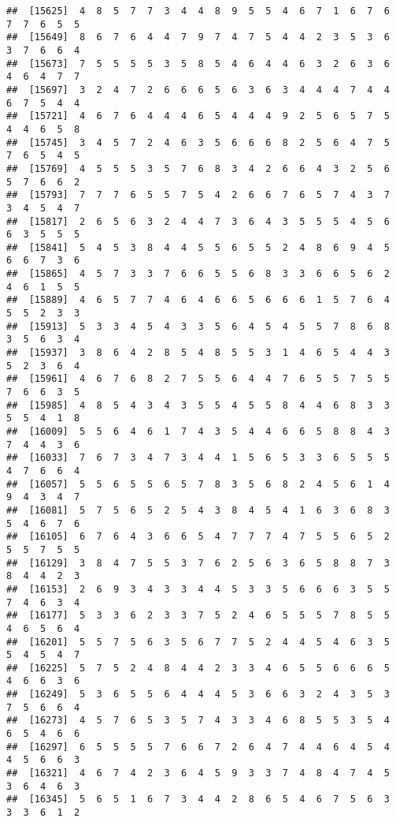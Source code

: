 \documentclass[
]{book}
\begin{document}
\begin{verbatim}
##  [15625]  4  8  5  7  7  3  4  4  8  9  5  5  4  6  7  1  6  7  6  7  7  6  5  5
##  [15649]  8  6  7  6  4  4  7  9  7  4  7  5  4  4  2  3  5  3  6  3  7  6  6  4
##  [15673]  7  5  5  5  5  3  5  8  5  4  6  4  4  6  3  2  6  3  6  4  6  4  7  7
##  [15697]  3  2  4  7  2  6  6  6  5  6  3  6  3  4  4  4  7  4  4  6  7  5  4  4
##  [15721]  4  6  7  6  4  4  4  6  5  4  4  4  9  2  5  6  5  7  5  4  4  6  5  8
##  [15745]  3  4  5  7  2  4  6  3  5  6  6  6  8  2  5  6  4  7  5  7  6  5  4  5
##  [15769]  4  5  5  5  3  5  7  6  8  3  4  2  6  6  4  3  2  5  6  5  7  6  6  2
##  [15793]  7  7  7  6  5  5  7  5  4  2  6  6  7  6  5  7  4  3  7  3  4  5  4  7
##  [15817]  2  6  5  6  3  2  4  4  7  3  6  4  3  5  5  5  4  5  6  6  3  5  5  5
##  [15841]  5  4  5  3  8  4  4  5  5  6  5  5  2  4  8  6  9  4  5  6  6  7  3  6
##  [15865]  4  5  7  3  3  7  6  6  5  5  6  8  3  3  6  6  5  6  2  4  6  1  5  5
##  [15889]  4  6  5  7  7  4  6  4  6  6  5  6  6  6  1  5  7  6  4  5  5  2  3  3
##  [15913]  5  3  3  4  5  4  3  3  5  6  4  5  4  5  5  7  8  6  8  3  5  6  3  4
##  [15937]  3  8  6  4  2  8  5  4  8  5  5  3  1  4  6  5  4  4  3  5  2  3  6  4
##  [15961]  4  6  7  6  8  2  7  5  5  6  4  4  7  6  5  5  7  5  5  7  6  6  3  5
##  [15985]  4  8  5  4  3  4  3  5  5  4  5  5  8  4  4  6  8  3  3  5  5  4  1  8
##  [16009]  5  5  6  4  6  1  7  4  3  5  4  4  6  6  5  8  8  4  3  7  4  4  3  6
##  [16033]  7  6  7  3  4  7  3  4  4  1  5  6  5  3  3  6  5  5  5  4  7  6  6  4
##  [16057]  5  5  6  5  5  6  5  7  8  3  5  6  8  2  4  5  6  1  4  9  4  3  4  7
##  [16081]  5  7  5  6  5  2  5  4  3  8  4  5  4  1  6  3  6  8  3  5  4  6  7  6
##  [16105]  6  7  6  4  3  6  6  5  4  7  7  7  4  7  5  5  6  5  2  5  5  7  5  5
##  [16129]  3  8  4  7  5  5  3  7  6  2  5  6  3  6  5  8  8  7  3  8  4  4  2  3
##  [16153]  2  6  9  3  4  3  3  4  4  5  3  3  5  6  6  6  3  5  5  7  4  6  3  4
##  [16177]  5  3  3  6  2  3  3  7  5  2  4  6  5  5  5  7  8  5  5  4  6  5  6  4
##  [16201]  5  5  7  5  6  3  5  6  7  7  5  2  4  4  5  4  6  3  5  5  4  5  4  7
##  [16225]  5  7  5  2  4  8  4  4  2  3  3  4  6  5  5  6  6  6  5  4  6  6  3  6
##  [16249]  5  3  6  5  5  6  4  4  4  5  3  6  6  3  2  4  3  5  3  7  5  6  6  4
##  [16273]  4  5  7  6  5  3  5  7  4  3  3  4  6  8  5  5  3  5  4  6  5  4  6  6
##  [16297]  6  5  5  5  5  7  6  6  7  2  6  4  7  4  4  6  4  5  4  4  5  6  6  3
##  [16321]  4  6  7  4  2  3  6  4  5  9  3  3  7  4  8  4  7  4  5  3  6  4  6  3
##  [16345]  5  6  5  1  6  7  3  4  4  2  8  6  5  4  6  7  5  6  3  3  3  6  1  2

\end{verbatim}
\end{document}
